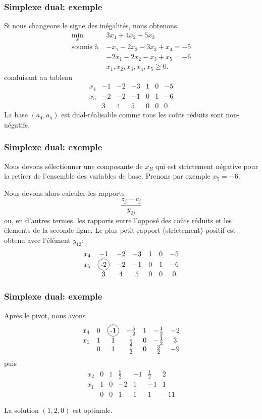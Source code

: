 \documentclass[usepdftitle=false]{beamer}
\newcommand*\circled[1]{\tikz[baseline=(char.base)]{
    \node[shape=circle,draw,inner sep=2pt] (char) {#1};}}
\begin{document}
\begin{frame}
\frametitle{Simplexe dual: exemple}

Si nous changeons le signe des inégalités, nous obtenons
\begin{align*}
\min_x \ & 3x_1 + 4x_2 + 5x_3 \\
\mbox{soumis à } & -x_1 - 2x_2 - 3x_3 + x_4 = -5 \\
& -2x_1 - 2x_2 - x_3 + x_5 = -6 \\
& x_1, x_2, x_3, x_4, x_5 \geq 0.
\end{align*}
conduisant au tableau
\[
\begin{matrix}
x_4 & -1 & -2 & -3 & 1 & 0 & -5 \\
x_5 & -2 & -2 & -1 & 0 & 1 & -6 \\
& 3 & 4 & 5 & 0 & 0 & 0
\end{matrix}
\]
La base $(a_4, a_5)$ est dual-réalisable comme tous les coûts réduits sont non-négatifs.

\end{frame}

\begin{frame}
\frametitle{Simplexe dual: exemple}

Nous devons sélectionner une composante de $x_B$ qui est strictement négative pour la retirer de l'ensemble des variables de base.
Prenons par exemple $x_5 = -6$.

\mbox{}

Nous devons alors calculer les rapports
\[
\frac{z_j - c_j}{y_{2j}}
\]
ou, en d'autres termes, les rapports entre l'opposé des coûts réduits et les élements de la seconde ligne.
Le plus petit rapport (strictement) positif est obtenu avec l'élément $y_{12}$:
\[
\begin{matrix}
x_4 & -1 & -2 & -3 & 1 & 0 & -5 \\
x_5 & \circled{-2} & -2 & -1 & 0 & 1 & -6 \\
& 3 & 4 & 5 & 0 & 0 & 0
\end{matrix}
\]

\end{frame}

\begin{frame}
\frametitle{Simplexe dual: exemple}

Après le pivot, nous avons
\[
\begin{matrix}
x_4 & 0 & \circled{-1} & -\frac{5}{2} & 1 & -\frac{1}{2} & -2 \\
x_1 & 1 & 1 & \frac{1}{2} & 0 & -\frac{1}{2} & 3 \\
& 0 & 1 & \frac{7}{2} & 0 & \frac{3}{2} & -9
\end{matrix}
\]
puis
\[
\begin{matrix}
x_2 & 0 & 1 & \frac{5}{2} & -1 & \frac{1}{2} & 2 \\
x_1 & 1 & 0 & -2 & 1 & -1 & 1 \\
& 0 & 0 & 1 & 1 & 1 & -11
\end{matrix}
\]

\mbox{}

La solution $(1, 2, 0)$ est optimale.

\end{frame}
\end{document}

